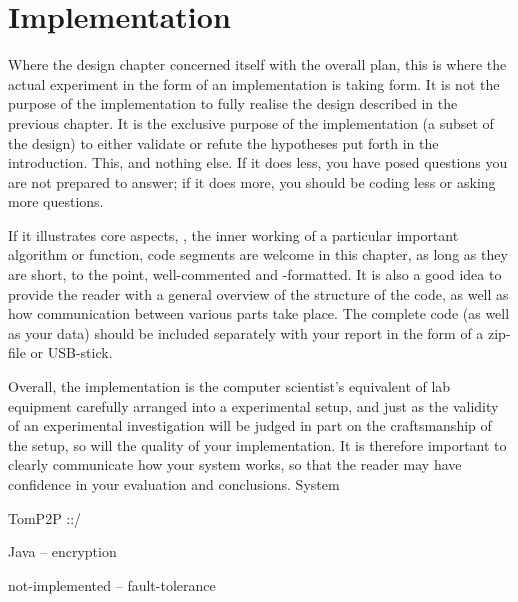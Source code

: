 \chapter{Implementation} \label{cha:implementation}
Where the design chapter concerned itself with the overall plan, this
is where the actual experiment in the form of an implementation is
taking form.  It is not the purpose of the implementation to fully
realise the design described in the previous chapter. It is the
exclusive purpose of the implementation (a subset of the design) to
either validate or refute the hypotheses put forth in the
introduction. This, and nothing else. If it does less, you have posed
questions you are not prepared to answer; if it does more, you should
be coding less or asking more questions.

If it illustrates core aspects, \eg, the inner working of a particular
important algorithm or function, code segments are welcome in this
chapter, as long as they are short, to the point, well-commented and
-formatted.  It is also a good idea to provide the reader with a
general overview of the structure of the code, as well as how
communication between various parts take place.  The complete code (as
well as your data) should be included separately with your report in
the form of a zip-file or USB-stick.

Overall, the implementation is the computer scientist's equivalent of
lab equipment carefully arranged into a experimental setup, and just
as the validity of an experimental investigation will be judged in
part on the craftsmanship of the setup, so will the quality of your
implementation. It is therefore important to clearly communicate how
your system works, so that the reader may have confidence in your
evaluation and conclusions.
System 


TomP2P ::/ 

Java -- encryption


not-implemented -- fault-tolerance

